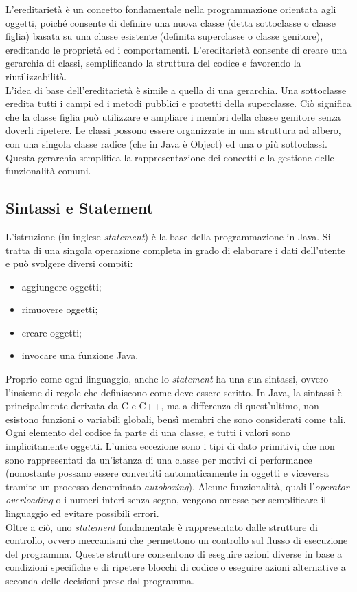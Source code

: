 L’ereditarietà è un concetto fondamentale nella programmazione orientata agli oggetti, poiché consente di definire una nuova classe (detta sottoclasse o classe figlia) basata su una classe esistente (definita superclasse o classe genitore), ereditando le proprietà ed i comportamenti.\cite{JAVA_w3schools3} L’ereditarietà consente di creare una gerarchia di classi, semplificando la struttura del codice e favorendo la riutilizzabilità.\\
L’idea di base dell’ereditarietà è simile a quella di una gerarchia. Una sottoclasse eredita tutti i campi ed i metodi pubblici e protetti della superclasse. Ciò significa che la classe figlia può utilizzare e ampliare i membri della classe genitore senza doverli ripetere. Le classi possono essere organizzate in una struttura ad albero, con una singola classe radice (che in Java è Object) ed una o più sottoclassi. Questa gerarchia semplifica la rappresentazione dei concetti e la gestione delle funzionalità comuni.\cite{JAVA_educative}

\subsection{Sintassi e Statement}

L’istruzione (in inglese \textit{statement}) è la base della programmazione in Java. Si tratta di una singola operazione completa in grado di elaborare i dati dell’utente e può svolgere diversi compiti:
\begin{itemize}
    \item aggiungere oggetti;
    \item rimuovere oggetti;
    \item creare oggetti;
    \item invocare una funzione Java.\cite{JAVA_oracle}
\end{itemize}
Proprio come ogni linguaggio, anche lo \textit{statement} ha una sua sintassi, ovvero l’insieme di regole che definiscono come deve essere scritto. In Java, la sintassi è principalmente derivata da C e C++, ma a differenza di quest’ultimo, non esistono funzioni o variabili globali, bensì membri che sono considerati come tali. Ogni elemento del codice fa parte di una classe, e tutti i valori sono implicitamente oggetti. L’unica eccezione sono i tipi di dato primitivi, che non sono rappresentati da un’istanza di una classe per motivi di performance (nonostante possano essere convertiti automaticamente in oggetti e viceversa tramite un processo denominato \textit{autoboxing}\cite{JAVA_oracle2}). Alcune funzionalità, quali l’\textit{operator overloading} o i numeri interi senza segno, vengono omesse per semplificare il linguaggio ed evitare possibili errori.\\
Oltre a ciò, uno \textit{statement} fondamentale è rappresentato dalle strutture di controllo, ovvero meccanismi che permettono un controllo sul flusso di esecuzione del programma. Queste strutture consentono di eseguire azioni diverse in base a condizioni specifiche e di ripetere blocchi di codice o eseguire azioni alternative a seconda delle decisioni prese dal programma.

